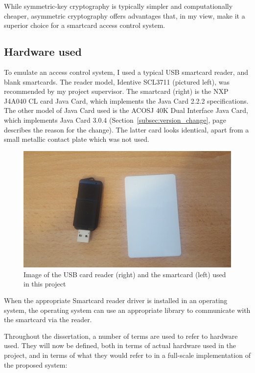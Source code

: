 \documentclass[12pt,a4paper]{article}
\begin{document}
While symmetric-key cryptography is typically simpler and computationally cheaper, asymmetric cryptography offers advantages that, in my view, make it a superior choice for a smartcard access control system.



\subsection{Hardware used}
To emulate an access control system, I used a typical USB smartcard reader, and blank smartcards. The reader model, Identive SCL3711 (pictured left), was recommended by my project supervisor. The smartcard (right) is the NXP J4A040 CL card Java Card, which implements the Java Card 2.2.2 specifications. The other model of Java Card used is the ACOSJ 40K Dual Interface Java Card, which implements Java Card 3.0.4 (Section~\ref{subsec:version_change}, page~\pageref{subsec:version_change} describes the reason for the change). The latter card looks identical, apart from a small metallic contact plate which was not used.

\begin{figure} [ht]
	\centering
	\includegraphics[scale=0.05]{introduction/hardware}
	\caption{Image of the USB card reader (right) and the smartcard (left) used in this project}
\end{figure}

When the appropriate Smartcard reader driver is installed in an operating system, the operating system can use an appropriate library to communicate with the smartcard via the reader.


Throughout the dissertation, a number of terms are used to refer to hardware used. They will now be defined, both in terms of actual hardware used in the project, and in terms of what they would refer to in a full-scale implementation of the proposed system:
\end{document}
